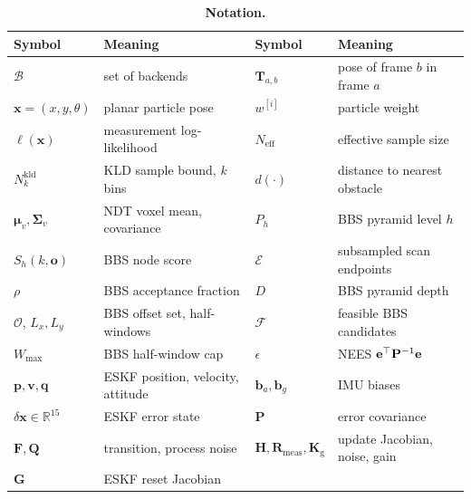 \begin{table}[h]
\centering
\caption{\textbf{Notation.}}\label{tab:notation}
\small
\begin{tabular}{@{}ll@{\qquad}ll@{}}
\toprule
Symbol & Meaning & Symbol & Meaning \\
\midrule
$\mathcal{B}$ & set of backends & $\mathbf{T}_{a,b}$ & pose of frame $b$ in frame $a$ \\
$\mathbf{x}=(x,y,\theta)$ & planar particle pose & $w^{[i]}$ & particle weight \\
$\ell(\mathbf{x})$ & measurement log-likelihood & $N_{\mathrm{eff}}$ & effective sample size \\
$N^{\mathrm{kld}}_k$ & KLD sample bound, $k$ bins & $d(\cdot)$ & distance to nearest obstacle \\
$\boldsymbol{\mu}_v,\boldsymbol{\Sigma}_v$ & NDT voxel mean, covariance & $P_h$ & BBS pyramid level $h$ \\
$S_h(k,\mathbf{o})$ & BBS node score & $\mathcal{E}$ & subsampled scan endpoints \\
$\rho$ & BBS acceptance fraction & $D$ & BBS pyramid depth \\
$\mathcal{O}$, $L_x,L_y$ & BBS offset set, half-windows & $\mathcal{F}$ & feasible BBS candidates \\
$W_{\max}$ & BBS half-window cap & $\epsilon$ & NEES $\mathbf{e}^{\top}\mathbf{P}^{-1}\mathbf{e}$ \\
$\mathbf{p},\mathbf{v},\mathbf{q}$ & ESKF position, velocity, attitude & $\mathbf{b}_a,\mathbf{b}_g$ & IMU biases \\
$\delta\mathbf{x}\in\mathbb{R}^{15}$ & ESKF error state & $\mathbf{P}$ & error covariance \\
$\mathbf{F},\mathbf{Q}$ & transition, process noise & $\mathbf{H},\mathbf{R}_{\mathrm{meas}},\mathbf{K}_{\mathrm{g}}$ & update Jacobian, noise, gain \\
$\mathbf{G}$ & ESKF reset Jacobian & & \\
\bottomrule
\end{tabular}
\end{table}

